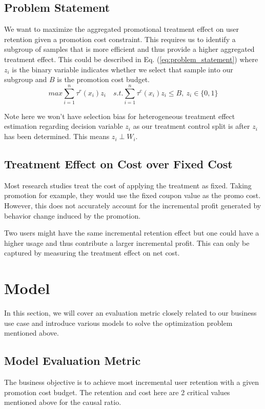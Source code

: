 \subsection{Problem Statement}
We want to maximize the aggregated promotional treatment effect on user retention given a promotion cost constraint. This requires us to identify a subgroup of samples that is more efficient and thus provide a higher aggregated treatment effect. This could be described in Eq. (\ref{eq:problem_statement}) where $z_i$ is the binary variable indicates whether we select that sample into our subgroup and $B$ is the promotion cost budget.
\begin{equation}
  \label{eq:problem_statement}
  max \sum_{i=1}^n\tau^r(x_i)z_i \quad 
  s.t. \sum_{i=1}^n\tau^c(x_i)z_i \leq B, \ z_i \in \{0, 1\}
\end{equation}

Note here we won't have selection bias for heterogeneous treatment effect estimation regarding decision variable $z_i$ as our treatment control split is after $z_i$ has been determined. This means $z_i \perp W_i$.

\subsection{Treatment Effect on Cost over Fixed Cost}
Most research studies treat the cost of applying the treatment as fixed. Taking promotion for example, they would use the fixed coupon value as the promo cost. However, this does not accurately account for the incremental profit generated by behavior change induced by the promotion.

Two users might have the same incremental retention effect but one could have a higher usage and thus contribute a larger incremental profit. This can only be captured by measuring the treatment effect on net cost.

\section{Model}

In this section, we will cover an evaluation metric closely related to our business use case and introduce various models to solve the optimization problem mentioned above.

\subsection{Model Evaluation Metric}
The business objective is to achieve most incremental user retention with a given promotion cost budget. The retention and cost here are 2 critical values mentioned above for the causal ratio. 

